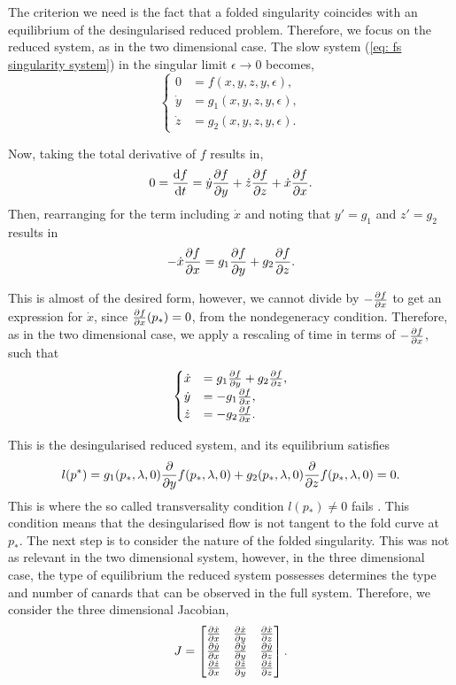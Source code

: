 The criterion we need is the fact that a folded singularity coincides with an equilibrium of the desingularised reduced problem. Therefore, we focus on the reduced system, as in the two dimensional case. The slow system (\ref{eq: fs singularity system}) in the singular limit $\epsilon \to 0$ becomes,
\begin{equation}
\begin{cases}
0 &=f(x,y,z,y,\epsilon),\\
\dot{y}&=g_1(x,y,z,y,\epsilon),\\
\dot{z}&=g_2(x,y,z,y,\epsilon).
\end{cases}\label{eq: fs singularity systemeps0}
\end{equation}

Now, taking the total derivative of $f$ results in,
\begin{align*}
0 = \od{f}{t} =\dot{y}\pd{f}{y}+\dot{z}\pd{f}{z} + \dot{x}\pd{f}{x}.
\end{align*}
Then, rearranging for the term including $\dot{x}$ and noting that $ y'=g_1 $ and $ z'=g_2 $ results in
\begin{align*}
-\dot{x}\pd{f}{x} = g_1 \pd{f}{y}+ g_2\pd{f}{z}.
\end{align*}

This is almost of the desired form, however, we cannot divide by $-\pd{f}{x}$ to get an expression for $\dot{x}$, since $\pd{f}{x}(p_*)=0$, from the nondegeneracy condition.
Therefore, as in the two dimensional case, we apply a rescaling of time in terms of $-\pd{f}{x}$, such that
\begin{equation} \label{somegenericthreedim}
\begin{cases}
\dot{x}&=g_1\pd{f}{y}+g_2\pd{f}{z},\\
\dot{y}&=-g_1\pd{f}{x},\\
\dot{z}&=-g_2\pd{f}{x}.
\end{cases}
\end{equation}

This is the desingularised reduced system, and its equilibrium satisfies
\begin{align*}
l(p^*)= g_1(p_*,\lambda,0)\pd{}{y}f(p_*,\lambda,0)+g_2(p_*,\lambda,0)\pd{}{z}f(p_*,\lambda,0)=0.
\end{align*}
This is where the so called transversality condition $l(p_*) \neq 0$ fails \citep{Kuehn}. This condition means that the desingularised flow is not tangent to the fold curve at $p_*$.
The next step is to consider the nature of the folded singularity. This was not as relevant in the two dimensional system, however, in the three dimensional case, the type of equilibrium the reduced system possesses determines the type and number of canards that can be observed in the full system.
Therefore, we consider the three dimensional Jacobian,
\begin{equation}
J=\begin{bmatrix}
\pd{\dot{x}}{x}&\pd{\dot{x}}{y}&\pd{\dot{x}}{z}\\
\pd{\dot{y}}{x}&\pd{\dot{y}}{y}&\pd{\dot{y}}{z}\\
\pd{\dot{z}}{x}&\pd{\dot{z}}{y}&\pd{\dot{z}}{z}\\
\end{bmatrix}.
\end{equation}

